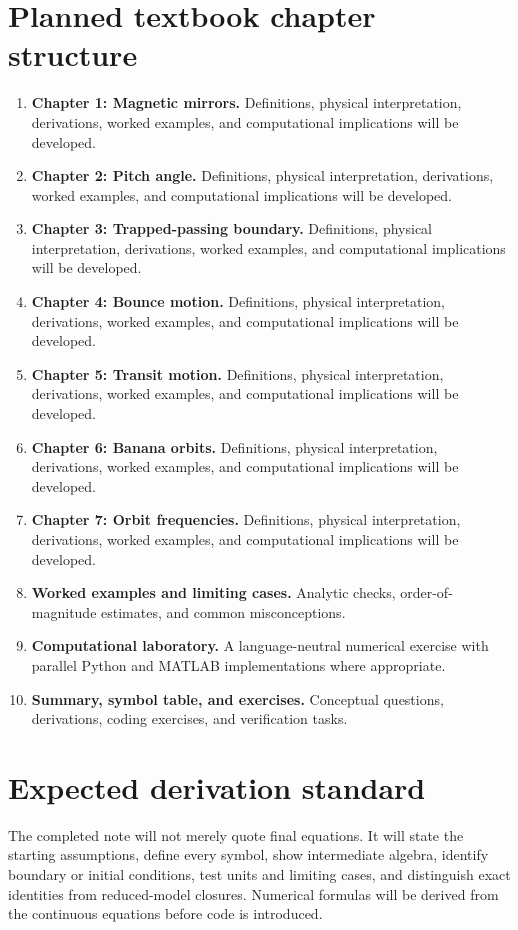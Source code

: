 \documentclass[11pt]{article}
\begin{document}
\section{Planned textbook chapter structure}
\begin{enumerate}[leftmargin=1.8em]
\item \textbf{Chapter 1: Magnetic mirrors.} Definitions, physical interpretation, derivations, worked examples, and computational implications will be developed.
\item \textbf{Chapter 2: Pitch angle.} Definitions, physical interpretation, derivations, worked examples, and computational implications will be developed.
\item \textbf{Chapter 3: Trapped-passing boundary.} Definitions, physical interpretation, derivations, worked examples, and computational implications will be developed.
\item \textbf{Chapter 4: Bounce motion.} Definitions, physical interpretation, derivations, worked examples, and computational implications will be developed.
\item \textbf{Chapter 5: Transit motion.} Definitions, physical interpretation, derivations, worked examples, and computational implications will be developed.
\item \textbf{Chapter 6: Banana orbits.} Definitions, physical interpretation, derivations, worked examples, and computational implications will be developed.
\item \textbf{Chapter 7: Orbit frequencies.} Definitions, physical interpretation, derivations, worked examples, and computational implications will be developed.
\item \textbf{Worked examples and limiting cases.} Analytic checks, order-of-magnitude estimates, and common misconceptions.
\item \textbf{Computational laboratory.} A language-neutral numerical exercise with parallel Python and MATLAB implementations where appropriate.
\item \textbf{Summary, symbol table, and exercises.} Conceptual questions, derivations, coding exercises, and verification tasks.
\end{enumerate}

\section{Expected derivation standard}
The completed note will not merely quote final equations. It will state the starting assumptions, define every symbol, show intermediate algebra, identify boundary or initial conditions, test units and limiting cases, and distinguish exact identities from reduced-model closures. Numerical formulas will be derived from the continuous equations before code is introduced.
\end{document}
